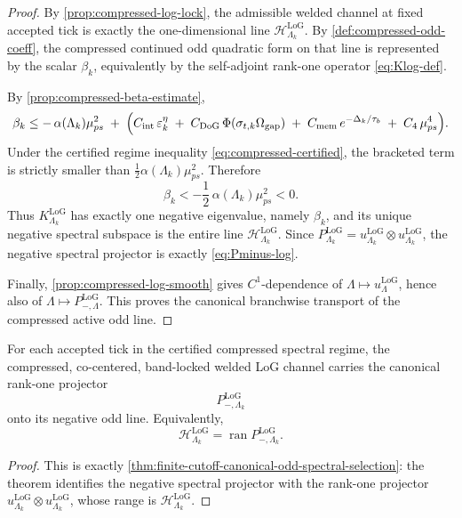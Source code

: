 \documentclass[11pt]{article}
\begin{document}
\begin{proof}
By \cref{prop:compressed-log-lock}, the admissible welded channel at fixed accepted tick is exactly the
one-dimensional line \(\mathcal H^{\mathrm{LoG}}_{\Lambda_k}\). By
\cref{def:compressed-odd-coeff}, the compressed continued odd quadratic form on that line is represented
by the scalar \(\beta_k\), equivalently by the self-adjoint rank-one operator
\eqref{eq:Klog-def}.

By \cref{prop:compressed-beta-estimate},
\[
\beta_k
\le
-\,\alpha(\Lambda_k)\mu_{ps}^2
\;+\;
\Big(
C_{\rm int}\,\varepsilon_k^{\eta}
\;+\;
C_{\rm DoG}\,\Phi(\sigma_{t,k}\Omega_{\rm gap})
\;+\;
C_{\rm mem}\,e^{-\Delta_k/\tau_b}
\;+\;
C_4\,\mu_{ps}^4
\Big).
\]
Under the certified regime inequality \eqref{eq:compressed-certified}, the bracketed term is strictly
smaller than \(\tfrac12\alpha(\Lambda_k)\mu_{ps}^2\). Therefore
\[
\beta_k
<
-\frac12\,\alpha(\Lambda_k)\mu_{ps}^2
<
0.
\]
Thus \(K^{\mathrm{LoG}}_{\Lambda_k}\) has exactly one negative eigenvalue, namely \(\beta_k\), and
its unique negative spectral subspace is the entire line
\(\mathcal H^{\mathrm{LoG}}_{\Lambda_k}\). Since
\(
P^{\mathrm{LoG}}_{\Lambda_k}
=
u^{\mathrm{LoG}}_{\Lambda_k}\otimes u^{\mathrm{LoG}}_{\Lambda_k}
\),
the negative spectral projector is exactly \eqref{eq:Pminus-log}.

Finally, \cref{prop:compressed-log-smooth} gives \(C^1\)-dependence of
\(\Lambda\mapsto u^{\mathrm{LoG}}_\Lambda\), hence also of
\(\Lambda\mapsto P_{-,\Lambda}^{\mathrm{LoG}}\). This proves the canonical branchwise transport of the
compressed active odd line.
\end{proof}

\begin{corollary}
\label{cor:compressed-export-selection}
For each accepted tick in the certified compressed spectral regime, the compressed, co-centered,
band-locked welded LoG channel carries the canonical rank-one projector
\[
P_{-,\Lambda_k}^{\mathrm{LoG}}
\]
onto its negative odd line. Equivalently,
\[
\mathcal H_{\Lambda_k}^{\mathrm{LoG}}
=
\operatorname{ran} P_{-,\Lambda_k}^{\mathrm{LoG}}.
\]
\end{corollary}

\begin{proof}
This is exactly \cref{thm:finite-cutoff-canonical-odd-spectral-selection}: the theorem identifies the
negative spectral projector with the rank-one projector
\(
u^{\mathrm{LoG}}_{\Lambda_k}\otimes u^{\mathrm{LoG}}_{\Lambda_k}
\),
whose range is \(\mathcal H^{\mathrm{LoG}}_{\Lambda_k}\).
\end{proof}
\end{document}
